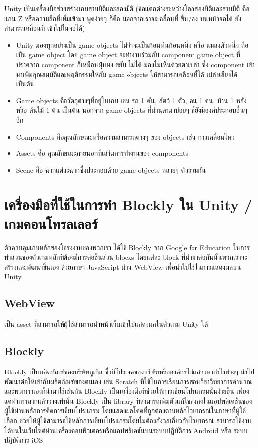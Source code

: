 Unity เป็นเครื่องมือช่วยสร้างเกมสามมิติและสองมิติ 
(ข้อแตกต่างระหว่างโลกสองมิติและสามมิติ คือแกน Z หรือความลึกที่เพิ่มเข้ามา 
พูดง่ายๆ ก็คือ นอกจากเราจะเคลื่อนที่ ขึ้น/ลง บนหน้าจอได้ ยังสามารถเคลื่อนที่ 
เข้าไปในจอได้)~\cite{unth}
\begin{itemize}
  \item Unity มองทุกอย่างเป็น game objects ไม่ว่าจะเป็นก้อนหินก้อนหนึ่ง 
  หรือ แมลงตัวหนึ่ง ถือเป็น game object โดย game object 
  จะทำงานร่วมกับ component game object ที่ปราศจาก component 
  ก็เหมือนฝุ่นผง ขยับ ไม่ได้ มองไม่เห็นด้วยตาเปล่า ซึ่ง component 
  เข้ามาเพิ่มคุณสมบัติและพฤติกรรมให้กับ game objects ให้สามารถเคลื่อนที่ได้ 
  เปล่งเสียงได้ เป็นต้น
  \item Game objects คือวัตถุต่างๆที่อยู่ในเกม 
  เช่น รถ 1 คัน, สัตว์ 1 ตัว, คน 1 คน, บ้าน 1 หลัง หรือ ต้นไม้ 1 ต้น เป็นต้น 
  นอกจาก game objects ที่ผ่านตามาบ่อยๆ  
  ก็ยังมีองค์ประกอบอื่นๆ อีก
  \item Components คือคุณลักษณะหรือความสามารถต่างๆ ของ objects เช่น การเคลื่อนไหว
  \item Assets คือ คุณลักษณะภายนอกที่เสริมการทำงานของ components
  \item Scene คือ ฉากแต่ละฉากซึ่งประกอบด้วย game objects หลายๆ ตัวรวมกัน
\end{itemize}

\section{เครื่องมือที่ใช้ในการทำ Blockly ใน Unity / เกมคอนโทรลเลอร์}
ตัวควบคุมเกมหลักของโครงงานของพวกเรา ได้ใช้ Blockly 
จาก Google for Education ในการทำส่วนของตัวเกมหลักที่ต้องมีการต่อชิ้นส่วน 
blocks โดยแต่ละ block ที่นำมาต่อกันนั้นพวกเราจะสร้างและพัฒนาขึ้นเอง ด้วยภาษา 
JavaScript ผ่าน WebView เพื่อนำไปใช้ในการแสดงผลบน Unity

\subsection{WebView}
เป็น asset ที่สามารถให้ผู้ใช้สามารถนำหน้าเว็บเข้าไปแสดงผลในตัวเกม Unity ได้~\cite{unw}

\subsection{Blockly}
Blockly เป็นผลิตภัณฑ์ของบริษัทกูเกิล ซึ่งมีโปรเจคของบริษัทหรือองค์กรไม่แสวงหากำไรต่างๆ นำไปพัฒนาต่อให้เข้ากับผลิตภัณฑ์ของตนเอง เช่น Scratch ที่ใช้ในการเรียนการสอนวิชาวิทยาการคำนวณ
และพวกเราเองก็นำมาใช้เช่นกัน Blockly 
เป็นเครื่องมือที่ช่วยให้การเขียนโปรแกรมนั้นง่ายขึ้น 
เพียงแค่ทำการลากแล้ววางเท่านั้น   Blockly เป็น library ที่สามารถเพิ่มตัวแก้ไขลงลงในแอปพลิเคชันของผู้ใช้ผ่านหลักการคิดการเขียนโปรแกรม
 โดยแสดงผลโค้ดที่ถูกต้องตามหลักไวยากรณ์ในภาษาที่ผู้ใช้เลือก 
ช่วยให้ผู้ใช้สามารถใช้หลักการเขียนโปรแกรมโดยไม่ต้องกังวลเกี่ยวกับไวยากรณ์ 
สามารถใช้งานได้บนในเว็บไซต์ผ่านเครื่องคอมพิวเตอรหรือแอปพลิเคชันบนระบบปฏิบัติการ Android หรือ ระบบปฏิบัติการ iOS~\cite{blc}

